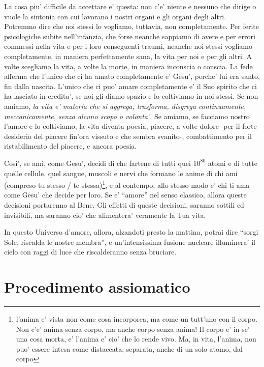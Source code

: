 La cosa piu' difficile da accettare e' questa: non c'e' niente e nessuno che dirige o vuole la sintonia con cui lavorano i nostri organi e gli organi degli altri. Potremmo dire che noi stessi lo vogliamo, tuttavia, non completamente. Per ferite psicologiche subite nell'infanzia, che forse neanche sappiamo di avere e per errori commessi nella vita e per i loro conseguenti traumi, neanche noi stessi vogliamo completamente, in maniera perfettamente sana, la vita per noi e per gli altri. A volte scegliamo la vita, a volte la morte, in maniera inconscia o conscia. La fede afferma che l'unico che ci ha amato completamente e' Gesu', perche' lui era santo, fin dalla nascita. L'unico che ci puo' amare completamente e' il Suo spirito che ci ha lasciato in eredita', se noi gli diamo spazio e lo coltiviamo in noi stessi. Se non amiamo, \emph{la vita e' materia che si aggrega, trasforma, disgrega continuamente, meccanicamente, senza alcuno scopo o volonta'}. Se amiamo, se facciamo nostro l'amore e lo coltiviamo, la vita diventa poesia, piacere, a volte dolore -per il forte desiderio del piacere fin'ora vissuto e che sembra svanito-, combattimento per il ristabilimento del piacere, e ancora poesia. 

Cosi', se ami, come Gesu', decidi di che fartene di tutti quei $10^{80}$ atomi e di tutte quelle cellule, quel sangue, muscoli e nervi che formano le anime di chi ami (compreso tu stesso / te stessa)\footnote{l'anima e' vista non come cosa incorporea, ma come un tutt'uno con il corpo. Non c'e' anima senza corpo, ma anche corpo senza anima! Il corpo e' in se' una cosa morta, e' l'anima e' cio' che lo rende vivo. Ma, in vita, l'anima, non puo' essere intesa come distaccata, separata, anche di un solo atomo, dal corpo}, e al contempo, allo stesso modo e' chi ti ama come Gesu' che decide per loro. Se e' ``amore'' nel senso classico, allora queste decisioni portarenno al Bene. Gli effetti di queste decisioni, saranno sottili ed invisibili, ma saranno cio' che alimentera' veramente la Tua vita.

In questo Universo d'amore, allora, alzandoti presto la mattina, potrai dire ``sorgi Sole, riscalda le nostre membra'', e un'intensissima fusione nucleare illuminera' il cielo con raggi di luce che riscalderanno senza bruciare.


\section{Procedimento assiomatico}
\label{procAx}

